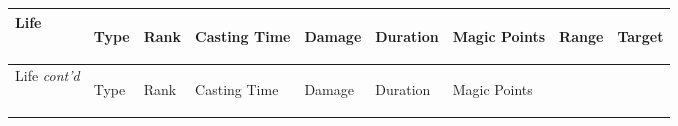 \documentclass[twoside]{book}
\begin{document}
\begin{longtable}{p{1.25in}lp{2em}p{3em}llp{7em}ll} 
  Life
  &
  \begin{turn}{70}{Type}\end{turn}
          
  &
  \begin{turn}{70}{Rank}\end{turn}
          
  &
  \begin{turn}{70}{Casting Time}\end{turn}
          
  &
  \begin{turn}{70}{Damage}\end{turn}
          
  &
  \begin{turn}{70}{Duration}\end{turn}
          
  &
  \begin{turn}{70}{Magic Points}\end{turn}
          
  &
  \begin{turn}{70}{Range}\end{turn}
          
  &
  \begin{turn}{70}{Target}\end{turn}
          
  \\
  \hline
  \hline
  \endfirsthead
  Life \textit{cont'd}
        
  &
  \begin{turn}{70}{Type}\end{turn}
          
  &
  \begin{turn}{70}{Rank}\end{turn}
          
  &
  \begin{turn}{70}{Casting Time}\end{turn}
          
  &
  \begin{turn}{70}{Damage}\end{turn}
          
  &
  \begin{turn}{70}{Duration}\end{turn}
          
  &
  \begin{turn}{70}{Magic Points}\end{turn}
          

\end{longtable}
\end{document}
